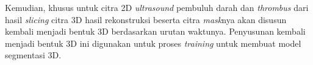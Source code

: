 {%

%
%


Kemudian, khusus untuk citra 2D \textit{ultrasound} pembuluh darah dan \textit{thrombus} dari hasil \textit{slicing} citra 3D hasil rekonstruksi beserta citra \textit{mask}nya akan disusun kembali menjadi bentuk 3D berdasarkan urutan waktunya. Penyusunan kembali menjadi bentuk 3D ini digunakan untuk proses \textit{training} untuk membuat model segmentasi 3D. 

}
